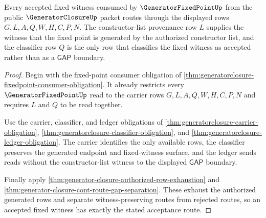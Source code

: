 \begin{theorem}
\label{thm:generatorclosure-fixedpoint-acceptance-route}
Every accepted fixed witness consumed by $\GeneratorFixedPointUp$ from the public $\GeneratorClosureUp$ packet routes through the displayed rows $G,L,A,Q,W,H,C,P,N$. The constructor-list provenance row $L$ supplies the witness that the fixed point is generated by the authorized constructor list, and the classifier row $Q$ is the only row that classifies the fixed witness as accepted rather than as a $\mathsf{GAP}$ boundary.
\end{theorem}
\begin{proof}
Begin with the fixed-point consumer obligation of \autoref{thm:generatorclosure-fixedpoint-consumer-obligation}. It already restricts every $\GeneratorFixedPointUp$ read to the carrier rows $G,L,A,Q,W,H,C,P,N$ and requires $L$ and $Q$ to be read together.

Use the carrier, classifier, and ledger obligations of \autoref{thm:generatorclosure-carrier-obligation}, \autoref{thm:generatorclosure-classifier-obligation}, and \autoref{thm:generatorclosure-ledger-obligation}. The carrier identifies the only available rows, the classifier preserves the generated endpoint and fixed-witness surface, and the ledger sends reads without the constructor-list witness to the displayed $\mathsf{GAP}$ boundary.

Finally apply \autoref{thm:generator-closure-authorized-row-exhaustion} and \autoref{thm:generator-closure-cont-route-gap-separation}. These exhaust the authorized generated rows and separate witness-preserving routes from rejected routes, so an accepted fixed witness has exactly the stated acceptance route.
\end{proof}

